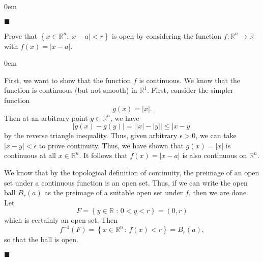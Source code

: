 \documentclass[12pt]{article}
\renewcommand{\qed}{\hfill$\blacksquare$}
\renewenvironment{proof}{\begin{addmargin}[1em]{0em}\begin{newproof}}{\end{newproof}\end{addmargin}\qed}
\newenvironment{problem}[2][Problem]{\begin{trivlist}
\item[\hskip \labelsep {\bfseries #1}\hskip \labelsep {\bfseries #2.}]}{\end{trivlist}}
\begin{document}
\begin{proof}
\begin{itemize}
 \end{itemize}
\end{proof}
 
 
 
 
 
 
\begin{problem}{1.27}
Prove that $\left\{ x\in \mathbb{R}^n: \left|x-a\right| < r \right\}$ is open by considering the function $f: \mathbb{R}^n\rightarrow \mathbb{R}$ with $f\left(x\right) = \left|x-a\right|$.
\end{problem}
 
\begin{proof}
First, we want to show that the function $f$ is continuous. We know that the function is continuous (but not smooth) in $\mathbb{R}^1$. First, consider the simpler function $$ g\left(x\right) = \left|x\right|. $$ Then at an arbitrary point $y\in \mathbb{R}^n$, we have $$ \left|g\left(x\right)-g\left(y\right)\right| = \left| \left|x\right| - \left|y\right|\right| \leq \left| x - y \right| $$ by the reverse triangle inequality. Thus, given arbitrary $\epsilon > 0$, we can take $\left|x-y\right| < \epsilon$ to prove continuity. Thus, we have shown that $g\left(x\right) = \left|x\right|$ is continuous at all $x \in \mathbb{R}^n$. It follows that $f\left(x\right) = \left|x-a\right|$ is also continuous on $\mathbb{R}^n$. 

We know that by the topological definition of continuity, the preimage of an open set under a continuous function is an open set. Thus, if we can write the open ball $B_r\left(a\right)$ as the preimage of a suitable open set under $f$, then we are done. Let $$ F = \left\{ y \in \mathbb{R} \, \, : \,0 < y < r \right\}=\left(0,r\right)$$ which is certainly an open set. Then $$ f^{-1}\left(F\right) = \left\{ x \in  \mathbb{R}^n \, : \, f\left(x\right) < r \right\} = B_r\left(a\right), $$ so that the ball is open.
\end{proof}
 
 
 
\end{document}
